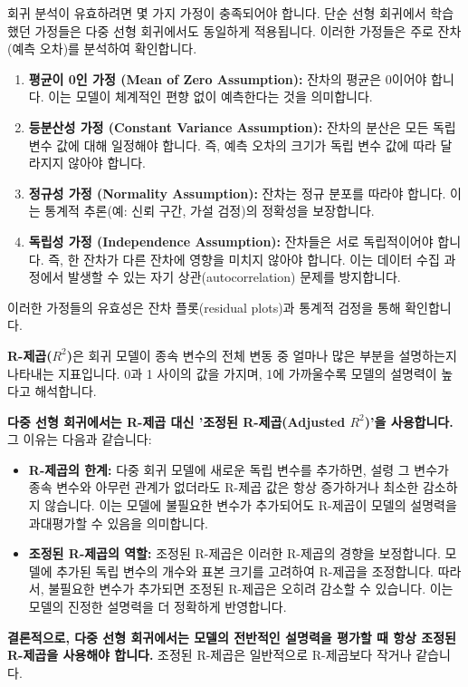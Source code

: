 \documentclass[11pt,a4paper]{book}
\theoremstyle{definition}
\begin{document}
\begin{tcolorbox}[title={\textbf{회귀 모델의 가정 (Regression Model Assumptions)}}]
회귀 분석이 유효하려면 몇 가지 가정이 충족되어야 합니다. 단순 선형 회귀에서 학습했던 가정들은 다중 선형 회귀에서도 동일하게 적용됩니다. 이러한 가정들은 주로 잔차(예측 오차)를 분석하여 확인합니다.

\begin{enumerate}
    \item \textbf{평균이 0인 가정 (Mean of Zero Assumption):} 잔차의 평균은 0이어야 합니다. 이는 모델이 체계적인 편향 없이 예측한다는 것을 의미합니다.
    \item \textbf{등분산성 가정 (Constant Variance Assumption):} 잔차의 분산은 모든 독립 변수 값에 대해 일정해야 합니다. 즉, 예측 오차의 크기가 독립 변수 값에 따라 달라지지 않아야 합니다.
    \item \textbf{정규성 가정 (Normality Assumption):} 잔차는 정규 분포를 따라야 합니다. 이는 통계적 추론(예: 신뢰 구간, 가설 검정)의 정확성을 보장합니다.
    \item \textbf{독립성 가정 (Independence Assumption):} 잔차들은 서로 독립적이어야 합니다. 즉, 한 잔차가 다른 잔차에 영향을 미치지 않아야 합니다. 이는 데이터 수집 과정에서 발생할 수 있는 자기 상관(autocorrelation) 문제를 방지합니다.
\end{enumerate}
이러한 가정들의 유효성은 잔차 플롯(residual plots)과 통계적 검정을 통해 확인합니다.
\end{tcolorbox}

\begin{tcolorbox}[title={\textbf{R-제곱($R^2$)과 조정된 R-제곱(Adjusted $R^2$)}}]
\textbf{R-제곱($R^2$)}은 회귀 모델이 종속 변수의 전체 변동 중 얼마나 많은 부분을 설명하는지 나타내는 지표입니다. 0과 1 사이의 값을 가지며, 1에 가까울수록 모델의 설명력이 높다고 해석합니다.

\textbf{다중 선형 회귀에서는 R-제곱 대신 '조정된 R-제곱(Adjusted $R^2$)'을 사용합니다.}
그 이유는 다음과 같습니다:
\begin{itemize}
    \item \textbf{R-제곱의 한계:} 다중 회귀 모델에 새로운 독립 변수를 추가하면, 설령 그 변수가 종속 변수와 아무런 관계가 없더라도 R-제곱 값은 항상 증가하거나 최소한 감소하지 않습니다. 이는 모델에 불필요한 변수가 추가되어도 R-제곱이 모델의 설명력을 과대평가할 수 있음을 의미합니다.
    \item \textbf{조정된 R-제곱의 역할:} 조정된 R-제곱은 이러한 R-제곱의 경향을 보정합니다. 모델에 추가된 독립 변수의 개수와 표본 크기를 고려하여 R-제곱을 조정합니다. 따라서, 불필요한 변수가 추가되면 조정된 R-제곱은 오히려 감소할 수 있습니다. 이는 모델의 진정한 설명력을 더 정확하게 반영합니다.
\end{itemize}
\textbf{결론적으로, 다중 선형 회귀에서는 모델의 전반적인 설명력을 평가할 때 항상 조정된 R-제곱을 사용해야 합니다.} 조정된 R-제곱은 일반적으로 R-제곱보다 작거나 같습니다.
\end{tcolorbox}
\end{document}
